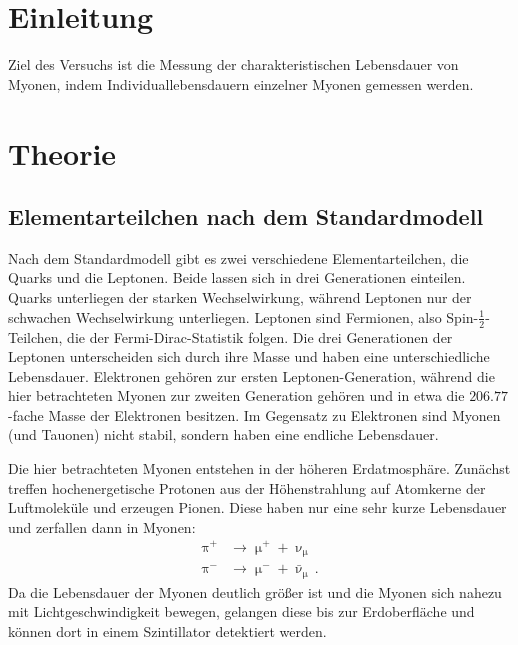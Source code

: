 \section{Einleitung}
Ziel des Versuchs ist die Messung der charakteristischen Lebensdauer von Myonen, indem Individuallebensdauern
einzelner Myonen gemessen werden.

\section{Theorie}
\subsection{Elementarteilchen nach dem Standardmodell}
Nach dem Standardmodell gibt es zwei verschiedene Elementarteilchen, die Quarks und die Leptonen. Beide lassen sich in
drei Generationen einteilen. Quarks unterliegen der starken Wechselwirkung, während Leptonen nur der schwachen Wechselwirkung
unterliegen. Leptonen sind Fermionen, also Spin-$\frac{1}{2}$-Teilchen, die der Fermi-Dirac-Statistik folgen.
Die drei Generationen der Leptonen unterscheiden sich durch ihre Masse und haben eine unterschiedliche Lebensdauer.
Elektronen gehören zur ersten Leptonen-Generation, während die hier betrachteten Myonen zur zweiten Generation gehören und in etwa
die $\num{206.77}$-fache Masse der Elektronen besitzen. Im Gegensatz zu Elektronen sind Myonen (und Tauonen) nicht stabil, sondern
haben eine endliche Lebensdauer.

Die hier betrachteten Myonen entstehen in der höheren Erdatmosphäre. Zunächst treffen hochenergetische Protonen aus der Höhenstrahlung
auf Atomkerne der Luftmoleküle und erzeugen Pionen. Diese haben nur eine sehr kurze Lebensdauer und zerfallen dann in Myonen:
\begin{align*}
  \uppi^+ &\to \upmu^+ + \upnu_{\upmu} \\
  \uppi^- &\to \upmu^- + \bar{\upnu}_{\upmu}\,.
\end{align*}
Da die Lebensdauer der Myonen deutlich größer ist und die Myonen sich nahezu mit Lichtgeschwindigkeit bewegen, gelangen diese
bis zur Erdoberfläche und können dort in einem Szintillator detektiert werden.

